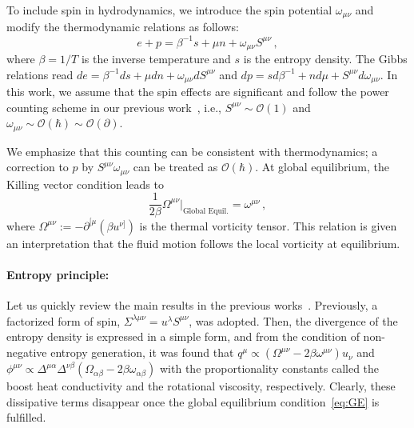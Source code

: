 \documentclass[prl,superscriptaddress,twocolumn,
  showpacs,preprintnumbers,amsmath,amssymb]{revtex4-1}
\begin{document}
To include spin in hydrodynamics, we introduce the spin potential $\omega_{\mu\nu}$ and modify the thermodynamic relations as follows:
\begin{equation}
  e+p = \beta^{-1} s + \mu n + \omega_{\mu\nu}S^{\mu\nu}\,,
  \label{eq:ThermoRela1}
\end{equation}
where $\beta=1/T$ is the inverse temperature and $s$ is the entropy density.  The Gibbs relations read $de=\beta^{-1}ds+\mu dn+\omega_{\mu\nu}dS^{\mu\nu}$ and $dp=s d\beta^{-1}+nd\mu+S^{\mu\nu}d\omega_{\mu\nu}$.  In this work, we assume that the spin effects are significant and follow the power counting scheme in our previous work~\cite{Fukushima:2020ucl}, i.e., $S^{\mu\nu}\sim \mathcal{O}(1)$ and $\omega_{\mu\nu}\sim\mathcal{O}(\hbar)\sim \mathcal{O}(\partial)$.

We emphasize that this counting can be consistent with thermodynamics;  a correction to $p$ by $S^{\mu\nu}\omega_{\mu\nu}$ can be treated as $\mathcal{O}(\hbar)$.
At global equilibrium, the Killing vector condition \citep{Becattini:2012tc} leads to
\begin{equation}
    \frac{1}{2\beta} \Omega^{\mu\nu} \biggr|_{\text{Global Equil.}} = \omega^{\mu\nu}\,,
    \label{eq:GE}
\end{equation}
where $\Omega^{\mu\nu} := -\partial^{[\mu} (\beta u^{\nu]} )$ is the thermal vorticity tensor.  This relation is given an interpretation that the fluid motion follows the local vorticity at equilibrium.
\vspace{0.5em}


\paragraph*{Entropy principle:}

Let us quickly review the main results in the previous works~\cite{Hattori:2019lfp,Fukushima:2020ucl}.  Previously, a factorized form of spin, $\Sigma^{\lambda\mu\nu}=u^\lambda S^{\mu\nu}$, was adopted.  Then, the divergence of the entropy density is expressed in a simple form, and from the condition of non-negative entropy generation, it was found that $q^\mu \propto (\Omega^{\mu\nu}-2\beta\omega^{\mu\nu})u_\nu$ and $\phi^{\mu\nu}\propto \Delta^{\mu\alpha}\Delta^{\nu\beta} (\Omega_{\alpha\beta} - 2\beta\omega_{\alpha\beta})$ with the proportionality constants called the boost heat conductivity and the rotational viscosity, respectively.  Clearly, these dissipative terms disappear once the global equilibrium condition~\eqref{eq:GE} is fulfilled.
\end{document}
